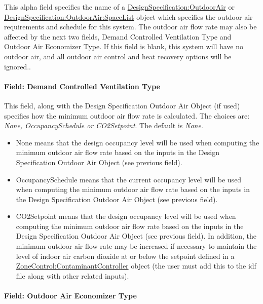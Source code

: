 This alpha field specifies the name of a \hyperref[designspecificationoutdoorair]{DesignSpecification:OutdoorAir} or \hyperref[designspecificationoutdoorairspacelist]{DesignSpecification:OutdoorAir:SpaceList} object which specifies the outdoor air requirements and schedule for this system. The outdoor air flow rate may also be affected by the next two fields, Demand Controlled Ventilation Type and Outdoor Air Economizer Type. If this field is blank, this system will have no outdoor air, and all outdoor air control and heat recovery options will be ignored..

\paragraph{Field: Demand Controlled Ventilation Type}\label{field-demand-controlled-ventilation-type}

This field, along with the Design Specification Outdoor Air Object (if used) specifies how the minimum outdoor air flow rate is calculated. The choices are: \emph{None, OccupancySchedule or CO2Setpoint}. The default is \emph{None}.

\begin{itemize}
\item
  None means that the design occupancy level will be used when computing the minimum outdoor air flow rate based on the inputs in the Design Specification Outdoor Air Object (see previous field).
\item
  OccupancySchedule means that the current occupancy level will be used when computing the minimum outdoor air flow rate based on the inputs in the Design Specification Outdoor Air Object (see previous field).
\item
  CO2Setpoint means that the design occupancy level will be used when computing the minimum outdoor air flow rate based on the inputs in the Design Specification Outdoor Air Object (see previous field). In addition, the minimum outdoor air flow rate may be increased if necessary to maintain the level of indoor air carbon dioxide at or below the setpoint defined in a \hyperref[zonecontrolcontaminantcontroller]{ZoneControl:ContaminantController} object (the user must add this to the idf file along with other related inputs).
\end{itemize}

\paragraph{Field: Outdoor Air Economizer Type}\label{field-outdoor-air-economizer-type}

